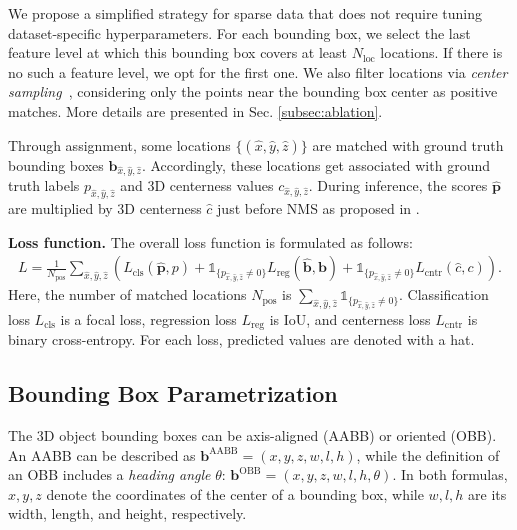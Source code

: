 \documentclass[runningheads]{llncs}
\begin{document}
We propose a simplified strategy for sparse data that does not require tuning dataset-specific hyperparameters. For each bounding box, we select the last feature level at which this bounding box covers at least $N_{\text{loc}}$ locations. If there is no such a feature level, we opt for the first one. We also filter locations via \textit{center sampling}~\cite{tian2019fcos}, considering only the points near the bounding box center as positive matches. More details are presented in Sec. \ref{subsec:ablation}.

Through assignment, some locations $\{(\hat{x}, \hat{y}, \hat{z})\}$ are matched with ground truth bounding boxes $\boldsymbol{b}_{\hat{x},\hat{y},\hat{z}}$. Accordingly, these locations get associated with ground truth labels $p_{\hat{x},\hat{y},\hat{z}}$ and 3D centerness values $c_{\hat{x},\hat{y},\hat{z}}$. During inference, the scores $\hat{\boldsymbol{p}}$ are multiplied by 3D centerness $\hat{c}$ just before NMS as proposed in  \cite{rukhovich2021imvoxelnet}.

\textbf{Loss function.} The overall loss function is formulated as follows:
\begin{equation}\begin{split}
    L=\frac{1}{N_\text{pos}}\sum_{\hat{x},\hat{y},\hat{z}}(L_\text{cls}(\hat{\boldsymbol{p}}, p)
    + \mathbb{1}_{\{p_{\hat{x},\hat{y},\hat{z}} \neq 0\}} L_\text{reg}(\hat{\boldsymbol{b}}, \boldsymbol{b})
    + \mathbb{1}_{\{p_{\hat{x},\hat{y},\hat{z}} \neq 0\}} L_\text{cntr}(\hat{c}, c)).
\end{split}\end{equation}
Here, the number of matched locations $N_{\text{pos}}$ is $\sum_{\hat{x},\hat{y},\hat{z}} \mathbb{1}_{\{p_{\hat{x},\hat{y},\hat{z}} \neq 0\}}$. Classification loss $L_\text{cls}$ is a focal loss, regression loss $L_\text{reg}$ is IoU, and centerness loss $L_\text{cntr}$ is binary cross-entropy. For each loss, predicted values are denoted with a hat.

\subsection{Bounding Box Parametrization}

The 3D object bounding boxes can be axis-aligned (AABB) or oriented (OBB). An AABB can be described as $\boldsymbol{b}^{\text{AABB}}=(x, y, z, w, l, h)$, while the definition of an OBB includes a \textit{heading angle} $\theta$: $\boldsymbol{b}^{\text{OBB}}=(x, y, z, w, l, h, \theta)$. In both formulas, $x, y, z$ denote the coordinates of the center of a bounding box, while $w, l, h$ are its width, length, and height, respectively.
\end{document}
